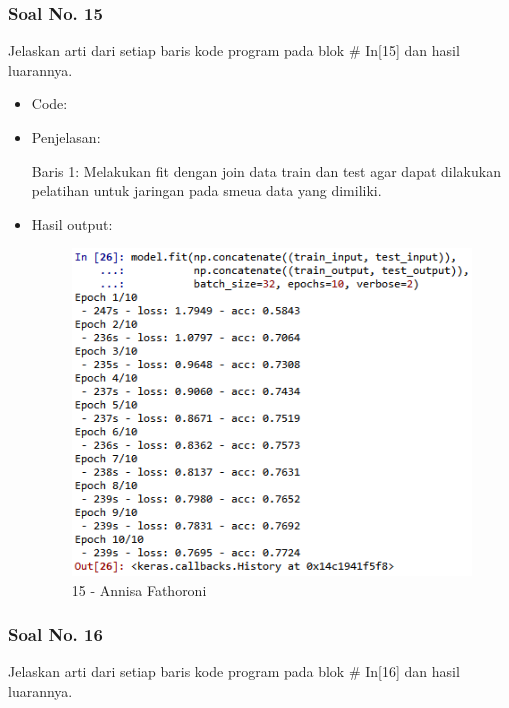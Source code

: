 \begin{itemize}
\end{itemize}

\subsubsection{Soal No. 15}
Jelaskan arti dari setiap baris kode program pada blok \# In[15] dan hasil luarannya.

\begin{itemize}
\item Code:


\item Penjelasan:

Baris 1: Melakukan fit dengan join data train dan test agar dapat dilakukan pelatihan untuk jaringan pada smeua data yang dimiliki.

\item Hasil output:

\begin{figure}[!hbtp]
\centering
\includegraphics[scale=0.7]{figures/Chapter 7/1164067/Praktek/Chapter7AnnisaFathoroni15.png}
\caption{15 - Annisa Fathoroni}
\label{15 - Annisa Fathoroni}
\end{figure}

\end{itemize}

\subsubsection{Soal No. 16}
Jelaskan arti dari setiap baris kode program pada blok \# In[16] dan hasil luarannya.

